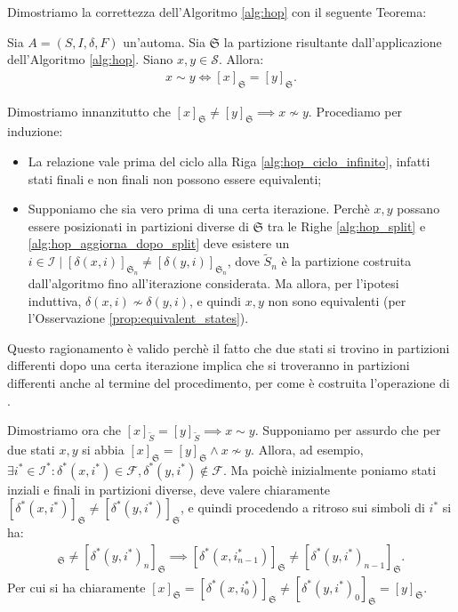 Dimostriamo la correttezza dell'Algoritmo \ref{alg:hop} con il seguente Teorema:
\begin{theorem}
    \label{teo:hop_corretto}
    Sia $A = (S,I,\delta,F)$ un'automa. Sia $\mathfrak{S}$ la partizione risultante dall'applicazione dell'Algoritmo \ref{alg:hop}. Siano $x,y \in \mathcal{S}$. Allora:
    \begin{gather*}
        x \sim y \iff [x]_{\mathfrak{S}} = [y]_{\mathfrak{S}}.
    \end{gather*}
\end{theorem}
\begin{proof2}
    Dimostriamo innanzitutto che $[x]_{\mathfrak{S}} \neq [y]_{\mathfrak{S}} \implies x \not\sim y$. Procediamo per induzione:
    \begin{itemize}
        \item La relazione vale prima del ciclo alla Riga \ref{alg:hop_ciclo_infinito}, infatti stati finali e non finali non possono essere equivalenti;
        \item Supponiamo che sia vero prima di una certa iterazione. Perchè $x,y$ possano essere posizionati in partizioni diverse di $\mathfrak{S}$ tra le Righe \ref{alg:hop_split} e \ref{alg:hop_aggiorna_dopo_split} deve esistere un $i \in \mathcal{I} \mid [\delta(x,i)]_{\mathfrak{S}_n} \neq [\delta(y,i)]_{\mathfrak{S}_n}$, dove $\widetilde{S}_n$ è la partizione costruita dall'algoritmo fino all'iterazione considerata. Ma allora, per l'ipotesi induttiva, $\delta(x,i) \not\sim \delta(y,i)$, e quindi $x,y$ non sono equivalenti (per l'Osservazione \ref{prop:equivalent_states}).
    \end{itemize}
    Questo ragionamento è valido perchè il fatto che due stati si trovino in partizioni differenti dopo una certa iterazione implica che si troveranno in partizioni differenti anche al termine del procedimento, per come è costruita l'operazione di \splitfunc.

    Dimostriamo ora che $[x]_{\widetilde{S}} = [y]_{\widetilde{S}} \implies x \sim y$. Supponiamo per assurdo che per due stati $x,y$ si abbia $[x]_{\mathfrak{S}} = [y]_{\mathfrak{S}} \land x \not\sim y$. Allora, ad esempio, $\exists i^* \in \mathcal{I}^* : \delta^*(x,i^*) \in \mathcal{F}, \delta^*(y,i^*) \not\in \mathcal{F}$. Ma poichè inizialmente poniamo stati inziali e finali in partizioni diverse, deve valere chiaramente $[\delta^*(x,i^*)]_{\mathfrak{S}} \neq [\delta^*(y,i^*)]_{\mathfrak{S}}$, e quindi procedendo a ritroso sui simboli di $i^*$ si ha:
    \begin{gather*}
        [\delta^*(x,i^*_n)]_{\mathfrak{S}} \neq [\delta^*(y,i^*)_n]_{\mathfrak{S}} \implies [\delta^*(x,i^*_{n-1})]_{\mathfrak{S}} \neq [\delta^*(y,i^*)_{n-1}]_{\mathfrak{S}}.
    \end{gather*}
    Per cui si ha chiaramente $[x]_{\mathfrak{S}} = [\delta^*(x,i^*_0)]_{\mathfrak{S}} \neq [\delta^*(y,i^*)_0]_{\mathfrak{S}} = [y]_{\mathfrak{S}}$.
\end{proof2}

